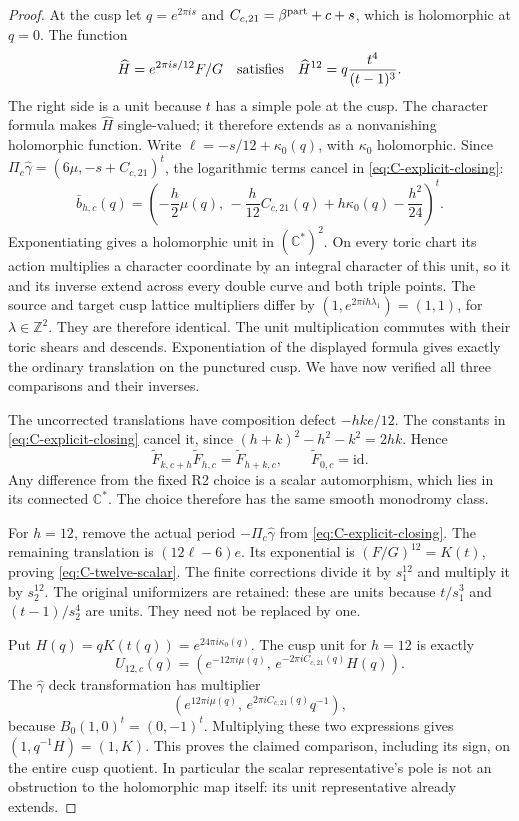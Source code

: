 \begin{proof}
At the cusp let \(q=e^{2\pi i s}\) and
\(C_{c,21}=\beta^{\rm part}+c+s\), which is holomorphic at
\(q=0\). The function
\[
 \widehat H=e^{2\pi i s/12}F/G
 \quad\hbox{satisfies}\quad
 \widehat H^{12}=q\frac{t^4}{(t-1)^3}.
\]
The right side is a unit because \(t\) has a simple pole at the
cusp. The character formula makes \(\widehat H\) single-valued;
it therefore extends as a nonvanishing holomorphic function. Write
\(\ell=-s/12+\kappa_0(q)\), with \(\kappa_0\) holomorphic.
Since
\(\Pi_c\widehat\gamma=(6\mu,-s+C_{c,21})^t\),
the logarithmic terms cancel in \eqref{eq:C-explicit-closing}:
\[
 \bar b_{h,c}(q)=
 \left(-\frac h2\mu(q),\,
 -\frac h{12}C_{c,21}(q)+h\kappa_0(q)-\frac{h^2}{24}\right)^t.
\]
Exponentiating gives a holomorphic unit in \((\mathbb C^*)^2\).
On every toric chart its action multiplies a character coordinate
by an integral character of this unit, so it and its inverse
extend across every double curve and both triple points. The
source and target cusp lattice multipliers differ by
\((1,e^{2\pi i h\lambda_1})=(1,1)\), for
\(\lambda\in\mathbb Z^2\). They are therefore identical. The
unit multiplication commutes with their toric shears and descends.
Exponentiation of the displayed formula gives exactly the ordinary
translation on the punctured cusp. We have now verified all
three comparisons and their inverses.

The uncorrected translations have composition defect
\(-hk e/12\). The constants in
\eqref{eq:C-explicit-closing} cancel it, since
\((h+k)^2-h^2-k^2=2hk\). Hence
\[
 \widetilde F_{k,c+h}\widetilde F_{h,c}
       =\widetilde F_{h+k,c},\qquad
 \widetilde F_{0,c}=\mathrm{id}.
\]
Any difference from the fixed R2 choice is a scalar automorphism,
which lies in its connected \(\mathbb C^*\). The choice therefore
has the same smooth monodromy class.

For \(h=12\), remove the actual period
\(-\Pi_c\widehat\gamma\) from \eqref{eq:C-explicit-closing}.
The remaining translation is \((12\ell-6)e\). Its exponential
is \((F/G)^{12}=K(t)\), proving
\eqref{eq:C-twelve-scalar}. The finite corrections divide it by
\(s_1^{12}\) and multiply it by \(s_2^{12}\). The original
uniformizers are retained: these are units because
\(t/s_1^3\) and \((t-1)/s_2^4\) are units. They need not be
replaced by one.

Put \(H(q)=qK(t(q))=e^{24\pi i\kappa_0(q)}\). The cusp unit
for \(h=12\) is exactly
\[
 U_{12,c}(q)=
 \left(e^{-12\pi i\mu(q)},\,
       e^{-2\pi i C_{c,21}(q)}H(q)\right).
\]
The \(\widehat\gamma\) deck transformation has multiplier
\[
 \left(e^{12\pi i\mu(q)},\,
       e^{2\pi i C_{c,21}(q)}q^{-1}\right),
\]
because \(B_0(1,0)^t=(0,-1)^t\). Multiplying these two
expressions gives \((1,q^{-1}H)=(1,K)\). This proves the
claimed comparison, including its sign, on the entire cusp
quotient. In particular the scalar representative's pole is not
an obstruction to the holomorphic map itself: its unit
representative already extends.


\end{proof}
